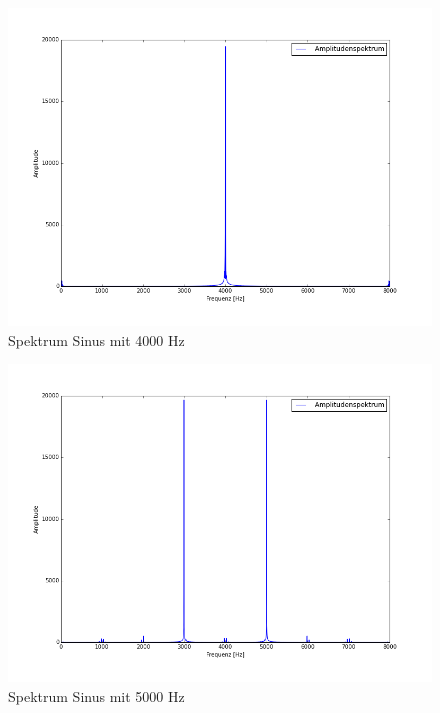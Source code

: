 \documentclass[12pt,oneside,a4paper]{report}
\begin{document}
\begin{figure}[H]
\centering\small
\includegraphics[scale=0.4]{src/4000fft.png}
\caption{Spektrum Sinus mit 4000 Hz}
\label{fig:4000_FFT}
\end{figure}

\begin{figure}[H]
\centering\small
\includegraphics[scale=0.4]{src/5000fft.png}
\caption{Spektrum Sinus mit 5000 Hz}
\label{fig:5000_FFT}
\end{figure}
\end{document}

